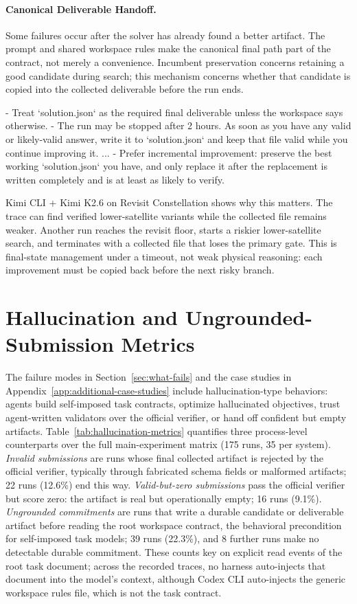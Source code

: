 \documentclass[11pt]{article}
\newenvironment{promptblock}
  {\VerbatimEnvironment\par\smallskip\Needspace{10\baselineskip}\noindent\begin{promptblockinner}}
  {\end{promptblockinner}\par\smallskip}
\begin{document}
\paragraph{Canonical Deliverable Handoff.} Some failures occur after the solver has already found a better artifact. The prompt and shared workspace rules make the canonical final path part of the contract, not merely a convenience. Incumbent preservation concerns retaining a good candidate during search; this mechanism concerns whether that candidate is copied into the collected deliverable before the run ends.
\begin{promptblock}
- Treat `solution.json` as the required final deliverable unless the workspace
  says otherwise.
- The run may be stopped after 2 hours. As soon as you have any valid or
  likely-valid answer, write it to `solution.json` and keep that file valid
  while you continue improving it.
...
- Prefer incremental improvement: preserve the best working `solution.json`
  you have, and only replace it after the replacement is written completely
  and is at least as likely to verify.
\end{promptblock}
Kimi CLI + Kimi K2.6 on Revisit Constellation shows why this matters. The trace can find verified lower-satellite variants while the collected file remains weaker. Another run reaches the revisit floor, starts a riskier lower-satellite search, and terminates with a collected file that loses the primary gate. This is final-state management under a timeout, not weak physical reasoning: each improvement must be copied back before the next risky branch.

\section{Hallucination and Ungrounded-Submission Metrics}
\label{app:hallucination-metrics}

The failure modes in Section~\ref{sec:what-fails} and the case studies in Appendix~\ref{app:additional-case-studies} include hallucination-type behaviors: agents build self-imposed task contracts, optimize hallucinated objectives, trust agent-written validators over the official verifier, or hand off confident but empty artifacts. Table~\ref{tab:hallucination-metrics} quantifies three process-level counterparts over the full main-experiment matrix (175 runs, 35 per system). \emph{Invalid submissions} are runs whose final collected artifact is rejected by the official verifier, typically through fabricated schema fields or malformed artifacts; 22 runs (12.6\%) end this way. \emph{Valid-but-zero submissions} pass the official verifier but score zero: the artifact is real but operationally empty; 16 runs (9.1\%). \emph{Ungrounded commitments} are runs that write a durable candidate or deliverable artifact before reading the root workspace contract, the behavioral precondition for self-imposed task models; 39 runs (22.3\%), and 8 further runs make no detectable durable commitment. These counts key on explicit read events of the root task document; across the recorded traces, no harness auto-injects that document into the model's context, although Codex CLI auto-injects the generic workspace rules file, which is not the task contract.
\end{document}
